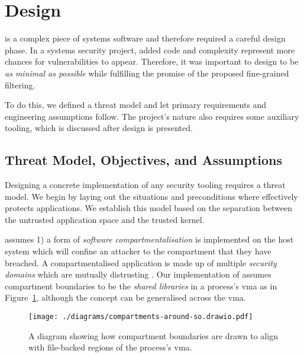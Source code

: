 \section{Design} \label{sec:design}

%
        

\af is a complex piece of systems software and therefore required a careful
design phase. In a systems security project, added code and complexity
represent more chances for vulnerabilities to appear. Therefore, it was
important to design \af to be \textit{as minimal as possible} while
fulfilling the promise of the proposed fine-grained filtering.

To do this, we defined a threat model and let primary requirements and
engineering assumptions follow. The project's nature also requires some auxiliary
tooling, which is discussed after \afg design is presented. 

\subsection{Threat Model, Objectives, and Assumptions}\label{subsec:objs-assumpions-tm}


Designing a concrete implementation of any security tooling requires a threat
model. We begin by laying out the situations and preconditions where \af effectively
protects applications. We establish this model based on the separation
between the untrusted application space and the trusted kernel. 

\af assumes 1) a form of \textit{software compartmentalisation} is implemented
on the host system which will confine an attacker to the compartment that
they have breached. A compartmentalised application is made up of multiple \textit
{security domains} which are mutually distrusting \cite{SOK}. Our
implementation of \af assumes compartment boundaries to be the \textit{shared
libraries} in a process's \ac{vma} as in Figure~\ref{fig:compartments-around-vma},
although the concept can be generalised across the \ac{vma}.

\begin{figure}[ht]
    \centering
    \texttt{[image: ./diagrams/compartments-around-so.drawio.pdf]} 
    \caption{A diagram showing how compartment boundaries are drawn to align
    with file-backed regions of the process's \ac{vma}.}
    \label{fig:compartments-around-vma}
\end{figure}

